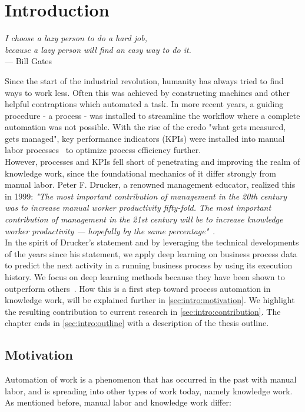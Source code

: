 \chapter{Introduction}\label{sec:intro}
\begin{flushright}{\slshape
I choose a lazy person to do a hard job,\\
because a lazy person will find an easy way to do it.}\\
\medskip
--- Bill Gates
\end{flushright}

\noindent Since the start of the industrial revolution, humanity has always tried to find ways to work less. Often this was achieved by constructing machines and other helpful contraptions which automated a task. In more recent years, a guiding procedure - a process - was installed to streamline the workflow where a complete automation was not possible. With the rise of the credo "what gets measured, gets managed", key performance indicators (KPIs) were installed into manual labor processes~\cite{web:taylorism-and-drucker} to optimize process efficiency further.\\

However, processes and KPIs fell short of penetrating and improving the realm of knowledge work, since the foundational mechanics of it differ strongly from manual labor. Peter F. Drucker, a renowned management educator, realized this in 1999:
{\slshape"The most important contribution of management in the 20th century was to increase manual worker productivity fifty-fold. The most important contribution of management in the 21st century will be to increase knowledge worker productivity — hopefully by the same percentage"}~\cite{drucker1999}.\\

In the spirit of Drucker's statement and by leveraging the technical developments of the years since his statement, we apply deep learning on business process data to predict the next activity in a running business process by using its execution history. We focus on deep learning methods because they have been shown to outperform others~\cite{tax2018interdisciplinary}. How this is a first step toward process automation in knowledge work, will be explained further in \autoref{sec:intro:motivation}.  We highlight the resulting contribution to current research in \autoref{sec:intro:contribution}. The chapter ends in \autoref{sec:intro:outline} with a description of the thesis outline.

\section{Motivation} \label{sec:intro:motivation}
Automation of work is a phenomenon that has occurred in the past with manual labor, and is spreading into other types of work today, namely knowledge work. As mentioned before, manual labor and knowledge work differ:

